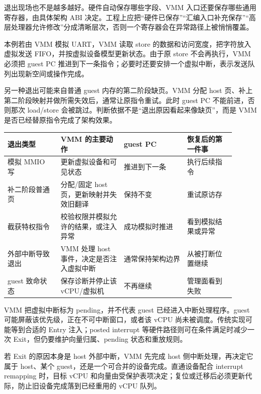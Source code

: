 退出现场也不是越多越好。硬件自动保存哪些字段、VMM 入口还要保存哪些通用寄存器，由具体架构 ABI 决定。工程上应把“硬件已保存”“汇编入口补充保存”“高层处理器允许修改”分成清晰层次，否则一个寄存器会在异常路径上被悄悄覆盖。


本例若由 VMM 模拟 UART，VMM 读取 store 的数据和访问宽度，把字符放入虚拟发送 FIFO，并按虚拟设备模型更新状态。由于原 store 不会再执行，VMM 必须把 guest PC 推进到下一条指令；必要时还要安排一个虚拟中断，表示发送队列出现新空间或操作完成。

另一种退出可能来自普通 guest 内存的第二阶段缺页。VMM 分配 host 页、补上第二阶段映射并做所需失效后，通常让原指令重试。此时 guest PC 不能前进，否则那次 load/store 会被跳过。判断依据不是“退出原因看起来像缺页”，而是 VMM 是否已经替原指令完成了架构效果。

\begin{longtable}{L{0.21\linewidth}L{0.25\linewidth}L{0.25\linewidth}L{0.19\linewidth}}
\toprule
退出类型 & VMM 的主要动作 & guest PC & 恢复后的第一件事 \\
\midrule
模拟 MMIO 写 & 更新虚拟设备和可见状态 & 推进到下一条 & 执行后续指令 \\\tablerowrule
补二阶段普通页 & 分配/固定 host 页，更新映射并失效旧翻译 & 保持不变 & 重试原访存 \\\tablerowrule
截获特权指令 & 校验权限并模拟允许的结果，或注入异常 & 成功模拟时推进 & 看到模拟结果或异常 \\\tablerowrule
外部中断导致退出 & VMM 处理 host 事件，决定是否注入虚拟中断 & 通常保持架构边界 & 从被打断位置继续 \\\tablerowrule
guest 致命状态 & 保存诊断并停止该 vCPU/虚拟机 & 不再继续 & 管理面看到失败 \\
\bottomrule
\end{longtable}


VMM 把虚拟中断标为 pending，并不代表 guest 已经进入中断处理程序。guest 可能屏蔽该优先级，正在不可中断窗口，或者该 vCPU 尚未被调度。传统实现可能等到合适的 Entry 注入；posted interrupt 等硬件路径则可在条件满足时减少一次 Exit，但仍要维护向量归属、pending 状态和重放规则。

若 Exit 的原因本身是 host 外部中断，VMM 先完成 host 侧中断处理，再决定它属于 host、某个 guest，还是一个可合并的设备完成。直通设备配合 interrupt remapping 时，目标 vCPU 和向量由受保护表项决定；复位或迁移后必须更新代际，防止旧设备完成落到已经重用的 vCPU 队列。

